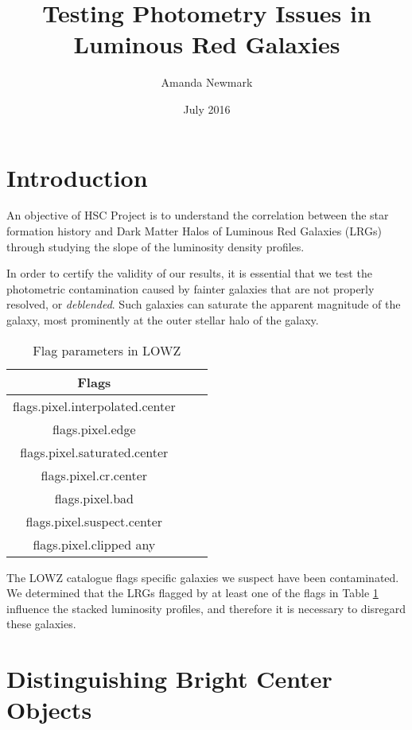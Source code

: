 \documentclass{article}
\title{Testing Photometry Issues in Luminous Red Galaxies}
\author{Amanda Newmark}
\date{July 2016}
\begin{document}
\begin{titlepage}
\maketitle
\end{titlepage}
\tableofcontents{}
\section{Introduction}

An objective of HSC Project is to understand the correlation between the star formation history and Dark Matter Halos of Luminous Red Galaxies (LRGs) through studying the slope of the luminosity density profiles.

In order to certify the validity of our results, it is essential that we test the photometric contamination caused by fainter galaxies that are not properly resolved, or \textit{deblended}. Such galaxies can saturate the apparent magnitude of the galaxy, most prominently at the outer stellar halo of the galaxy.

\begin{table}[h]
\centering
\begin{tabular}{||ccc||}
\hline
Flags  \\ 
\hline\hline
flags.pixel.interpolated.center  \\[1ex]
\hline
flags.pixel.edge \\
\hline
flags.pixel.saturated.center \\[1ex]
\hline
flags.pixel.cr.center \\
\hline
flags.pixel.bad \\
\hline 
flags.pixel.suspect.center \\[1ex]
\hline
flags.pixel.clipped any \\ [1ex]
\hline
\end{tabular}
\caption{Flag parameters in LOWZ}
\label{table:1}
\end{table}

The LOWZ catalogue flags specific galaxies we suspect have been contaminated. We determined that the LRGs flagged by at least one of the flags in Table \ref{table:1} influence the stacked luminosity profiles, and therefore it is necessary to disregard these galaxies. 

\section{Distinguishing Bright Center Objects}
\end{document}
